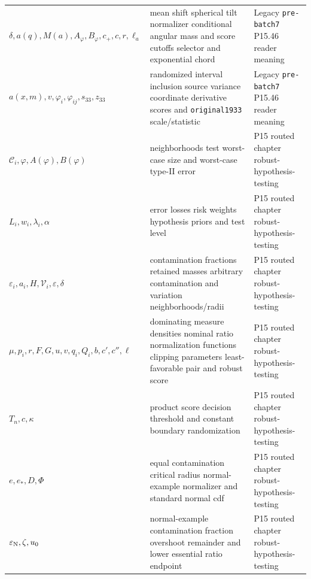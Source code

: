\begin{longtable}{@{}p{}p{}p{}@{}}
\(\delta,\allowbreak a(q),\allowbreak M(a),\allowbreak A_\varphi,\allowbreak B_\varphi,\allowbreak c_+,\allowbreak c,\allowbreak r,\allowbreak \ell_a\) & mean shift spherical tilt normalizer conditional angular mass and score cutoffs selector and exponential chord & Legacy \texttt{pre-\allowbreak{}batch7} P15.\allowbreak{}46 reader meaning \\
\(a(x,\allowbreak m),\allowbreak v,\allowbreak \varphi_i,\allowbreak \varphi_{ij},\allowbreak s_{33},\allowbreak z_{33}\) & randomized interval inclusion source variance coordinate derivative scores and \texttt{original1933} scale/statistic & Legacy \texttt{pre-\allowbreak{}batch7} P15.\allowbreak{}46 reader meaning \\
\(\mathcal C_i,\allowbreak \varphi,\allowbreak A(\varphi),\allowbreak B(\varphi)\) & neighborhoods test worst-case size and worst-case type-II error & P15 routed chapter robust-\allowbreak{}hypothesis-\allowbreak{}testing \\
\(L_i,\allowbreak w_i,\allowbreak \lambda_i,\allowbreak \alpha\) & error losses risk weights hypothesis priors and test level & P15 routed chapter robust-\allowbreak{}hypothesis-\allowbreak{}testing \\
\(\varepsilon_i,\allowbreak a_i,\allowbreak H,\allowbreak \mathcal V_i,\allowbreak \varepsilon,\allowbreak \delta\) & contamination fractions retained masses arbitrary contamination and variation neighborhoods/radii & P15 routed chapter robust-\allowbreak{}hypothesis-\allowbreak{}testing \\
\(\mu,\allowbreak p_i,\allowbreak r,\allowbreak F,\allowbreak G,\allowbreak u,\allowbreak v,\allowbreak q_i,\allowbreak Q_i,\allowbreak b,\allowbreak c',\allowbreak c'',\allowbreak \ell\) & dominating measure densities nominal ratio normalization functions clipping parameters least-favorable pair and robust score & P15 routed chapter robust-\allowbreak{}hypothesis-\allowbreak{}testing \\
\(T_n,\allowbreak c,\allowbreak \kappa\) & product score decision threshold and constant boundary randomization & P15 routed chapter robust-\allowbreak{}hypothesis-\allowbreak{}testing \\
\(e,\allowbreak e_*,\allowbreak D,\allowbreak \Phi\) & equal contamination critical radius normal-example normalizer and standard normal cdf & P15 routed chapter robust-\allowbreak{}hypothesis-\allowbreak{}testing \\
\(\varepsilon_{\rm N},\allowbreak \zeta,\allowbreak u_0\) & normal-example contamination fraction overshoot remainder and lower essential ratio endpoint & P15 routed chapter robust-\allowbreak{}hypothesis-\allowbreak{}testing \\

\end{longtable}
